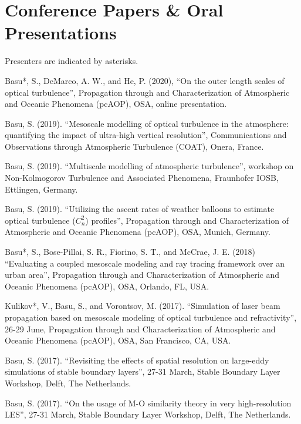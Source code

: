 \section*{Conference Papers \& Oral Presentations}
Presenters are indicated by asterisks.\\ 

\normalsize

\begin{etaremune}[topsep=0pt,itemsep=0pt,partopsep=0pt,parsep=0pt]
\item Basu*, S., DeMarco, A. W., and He, P. (2020), ``On the outer length scales of optical turbulence'', Propagation through and Characterization of Atmospheric and Oceanic Phenomena (pcAOP), OSA, online presentation. 
\item Basu, S. (2019). ``Mesoscale modelling of optical turbulence in the atmosphere: quantifying the impact of ultra-high vertical resolution'', Communications and Observations through Atmospheric Turbulence (COAT), Onera, France. 
\item Basu, S. (2019). ``Multiscale modelling of atmospheric turbulence'', workshop on Non-Kolmogorov Turbulence and Associated Phenomena, Fraunhofer IOSB, Ettlingen, Germany.
\item Basu, S. (2019). ``Utilizing the ascent rates of weather balloons to estimate optical turbulence ($C_n^2$) profiles'', Propagation through and Characterization of Atmospheric and Oceanic Phenomena (pcAOP), OSA, Munich, Germany. 
\item Basu*, S., Bose-Pillai, S. R., Fiorino, S. T., and McCrae, J. E. (2018) ``Evaluating a coupled mesoscale modeling and ray tracing framework over an urban area'', Propagation through and Characterization of Atmospheric and Oceanic Phenomena (pcAOP), OSA, Orlando, FL, USA. 
\item Kulikov*, V., Basu, S., and Vorontsov, M. (2017). ``Simulation of laser beam propagation based on mesoscale modeling of optical turbulence and refractivity'', 26-29 June, Propagation through and Characterization of Atmospheric and Oceanic Phenomena (pcAOP), OSA, San Francisco, CA, USA.
\item Basu, S. (2017). ``Revisiting the effects of spatial resolution on large-eddy simulations of stable boundary layers'', 27-31 March, Stable Boundary Layer Workshop, Delft, The Netherlands.  
\item Basu, S. (2017). ``On the usage of M-O similarity theory in very high-resolution LES'', 27-31 March, Stable Boundary Layer Workshop, Delft, The Netherlands. 

\end{etaremune}
